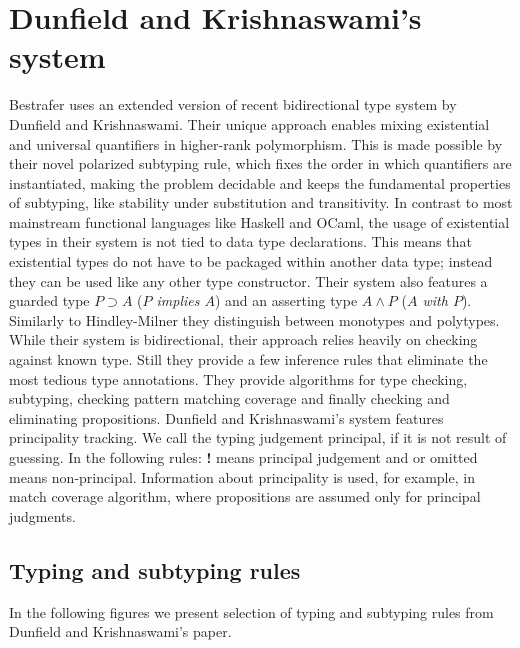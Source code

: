 \documentclass[declaration,shortabstract,english]{iithesis}
\begin{document}
\section{Dunfield and Krishnaswami's system}
Bestrafer uses an extended version of recent bidirectional type system by Dunfield and Krishnaswami\cite{gadt-popl19}.
Their unique approach enables mixing existential and universal quantifiers in higher-rank polymorphism. This is made possible by
their novel polarized subtyping rule, which fixes the order in which quantifiers are instantiated, making the
problem decidable and keeps the fundamental properties of subtyping, like stability under substitution and transitivity.
In contrast to most mainstream functional languages like Haskell and OCaml,
the usage of existential types in their system is not tied to data type declarations. This means that existential types
do not have to be packaged within another data type; instead they can be used like any other type constructor.
Their system also features a guarded type $P \supset A $ (\textit{$P$ implies $A$})
and an asserting type $A \wedge  P$ (\textit{$A$ with $P$}).
Similarly to Hindley-Milner they distinguish between monotypes and polytypes.
While their system is bidirectional, their approach relies heavily on checking against known type. Still they provide a few inference
rules that eliminate the most tedious type annotations.
They provide algorithms for type checking, subtyping, checking pattern matching coverage and finally checking and eliminating propositions.
Dunfield and Krishnaswami's system features principality tracking. We call the typing judgement principal, if it is not result of guessing.
In the following rules: \textbf{!} means principal judgement and \cancel{\textbf{!}} or omitted means non-principal.
Information about principality is used, for example, in match coverage algorithm, where propositions are assumed only
for principal judgments.
\subsection*{Typing and subtyping rules}
In the following figures we present selection of typing and subtyping rules from Dunfield and Krishnaswami's paper.
\end{document}
